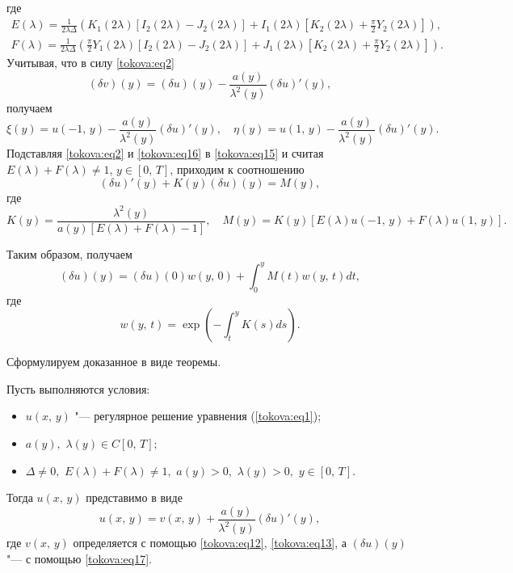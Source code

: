 где
\begin{gather*}
E(\lambda)=\frac{1}{2\lambda\Delta} \left(K_1 (2 \lambda)\left[I_2(2 \lambda)- J_2(2 \lambda)\right]+ I_1(2 \lambda)\left[K_2(2 \lambda)+\frac{\pi}{2}
Y_2 (2 \lambda)\right]\right), \\
F(\lambda)= \frac{1}{2\lambda \Delta} \left(\frac{\pi}{2}Y_1(2 \lambda) \left[I_2(2 \lambda)- J_2(2 \lambda)\right] +J_1(2 \lambda)\left[K_2(2 \lambda)+
\frac{\pi}{2} Y_2(2 \lambda)\right]\right).
\end{gather*}
Учитывая, что в силу \eqref{tokova:eq2}
\[
(\delta v)(y)=(\delta u)(y) -\frac{a(y)}{\lambda^2(y)}(\delta u)'(y),
\]
получаем
\begin{equation}
\label{tokova:eq16}
\xi(y)=u(-1,\,y)-\frac{a(y)}{\lambda^2(y)}(\delta
u)'(y), \quad \eta(y)=u(1,\,y)-\frac{a(y)}{\lambda^2(y)}(\delta u)'(y).
\end{equation}
Подставляя \eqref{tokova:eq2} и \eqref{tokova:eq16} в \eqref{tokova:eq15} и считая
$E(\lambda)+F(\lambda)\neq 1$, $y\in[0,\,T]$, приходим к соотношению
\[
(\delta u)'(y) +K(y)(\delta u)(y)= M(y),
\]
где
\[
K(y)=\frac{\lambda^2(y)}{a(y)\left[E(\lambda)+F(\lambda)-1\right]}, \quad M(y)=K(y)\left[E(\lambda)u(-1,\,y)+F(\lambda)u(1,\,y)\right].
\]

Таким образом, получаем
\begin{equation}
\label{tokova:eq17}
(\delta u)(y)=(\delta u)(0)w(y,\,0)+\int _0^y M(t)w(y,\,t)dt,
\end{equation}
где
\[
w(y,\,t)=\exp\left(-\int _t^y K(s)ds\right).
\]

Сформулируем доказанное в виде теоремы.

\smallskip

\hypertarget{tok:th:1}{}

\begin{theorem}[1]Пусть выполняются условия{\/\rm:} 
\begin{itemize} 
\item[\hypertarget{tok:1}{\rm 1)}] $u(x,\,y)$ "--- регулярное решение уравнения {\rm(\ref{tokova:eq1});} 
\item[\hypertarget{tok:2}{\rm 2)}] $a(y),$  $\lambda(y)\in C[0,\,T];$ 
\item[\hypertarget{tok:3}{\rm 3)}] $\Delta \neq 0,$ $E(\lambda)+F(\lambda)\neq 1,$ $a(y)>0,$  $\lambda(y)>0,$ $y \in[0,\,T].$ 
\end{itemize}
Тогда $u(x,\,y)$ представимо в виде
\begin{equation}
\label{tokova:eq18}
u(x,\,y)=v(x,\,y)+\frac{a(y)}{\lambda^2(y)}(\delta u)'(y),
\end{equation}
где $v(x,\,y)$ определяется с помощью \eqref{tokova:eq12}{\rm,} \eqref{tokova:eq13}{\rm ,} а $(\delta u)(y)$ "--- с помощью 
\eqref{tokova:eq17}\rm.
 \end{theorem}


